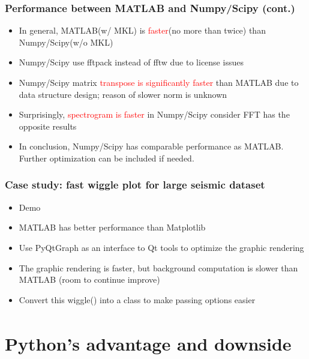 \documentclass[compress]{beamer}
\begin{document}
\begin{frame}
	\frametitle{Performance between MATLAB and Numpy/Scipy (cont.)}
	\begin{itemize}
		\item In general, MATLAB(w/ MKL) is \textcolor{red}{faster}(no more than twice) than Numpy/Scipy(w/o MKL)
		\item Numpy/Scipy use fftpack instead of fftw due to license issues
		\item Numpy/Scipy matrix \textcolor{red}{transpose is significantly faster} than MATLAB due to data structure design; reason of slower norm is unknown
		\item Surprisingly, \textcolor{red}{spectrogram is faster} in Numpy/Scipy consider FFT has the opposite results
		\vspace{1cm}
		\item In conclusion, Numpy/Scipy has comparable performance as MATLAB. Further optimization can be included if needed.
	\end{itemize}
\end{frame}

\begin{frame}
	\frametitle{Case study: fast wiggle plot for large seismic dataset}
	\begin{itemize}
		\item Demo \pause
		\item MATLAB has better performance than Matplotlib \pause
		\item Use PyQtGraph as an interface to Qt tools to optimize the graphic rendering \pause
		\item The graphic rendering is faster, but background computation is slower than MATLAB (room to continue improve) \pause
		\item Convert this wiggle() into a class to make passing options easier
	\end{itemize}
\end{frame}

\section{Python\textsuperscript{\texttrademark}'s advantage and downside}
\end{document}
